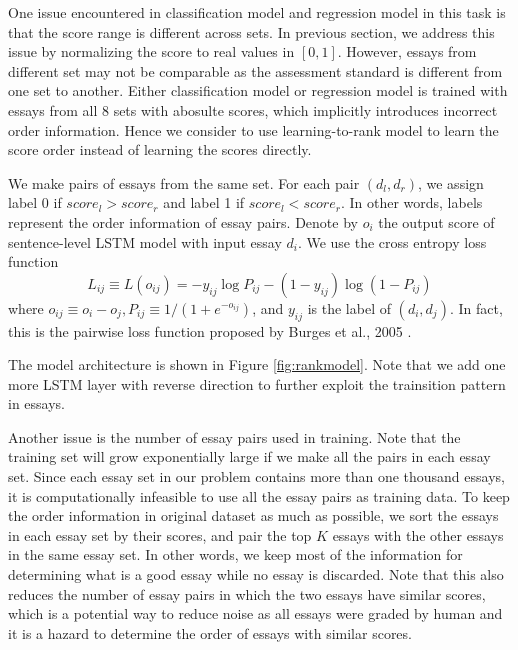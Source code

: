 \documentclass[10pt,psamsfonts]{amsart}
\theoremstyle{definition}
\theoremstyle{remark}
\numberwithin{equation}{section}
\begin{document}
One issue encountered in classification model and regression model in this task is that the score range is different across sets. In previous section, we address this issue by normalizing the score to real values in $[0, 1]$. However, essays from different set may not be comparable as the assessment standard is different from one set to another. Either classification model or regression model is trained with essays from all 8 sets with abosulte scores, which implicitly introduces incorrect order information. Hence we  consider to use learning-to-rank model to learn the score order instead of learning the scores directly. 

We make pairs of essays from the same set. For each pair $(d_l, d_r)$, we assign label 0 if $score_l>score_r$ and label 1 if $score_l<score_r$. In other words, labels represent the order information of essay pairs. Denote by $o_i$ the output score of sentence-level LSTM model with input essay $d_i$. We use the cross entropy loss function
$$L_{ij}\equiv L(o_{ij})=-y_{ij}\log P_{ij}-(1-y_{ij})\log(1-P_{ij})$$ 
where $o_{ij}\equiv o_i-o_j, P_{ij}\equiv 1/(1+e^{-o_{ij}})$, and $y_{ij}$ is the label of $(d_i, d_j)$. In fact, this is the pairwise loss function proposed by Burges et al., 2005 \cite{ranknet}.

The model architecture is shown in Figure \ref{fig:rankmodel}. Note that we add one more LSTM layer with reverse direction to further exploit the trainsition pattern in essays.

Another issue is the number of essay pairs used in training. Note that the training set will grow exponentially large if we make all the pairs in each essay set. Since each essay set in our problem contains more than one thousand essays, it is computationally infeasible to use all the essay pairs as training data. To keep the order information in original dataset as much as possible, we sort the essays in each essay set by their scores, and pair the top $K$ essays with the other essays in the same essay set. In other words, we keep most of the information for determining what is a good essay while no essay is discarded. Note that this also reduces the number of essay pairs in which the two essays have similar scores, which is a potential way to reduce noise as all essays were graded by human and it is a hazard to determine the order of essays with similar scores.
\end{document}
